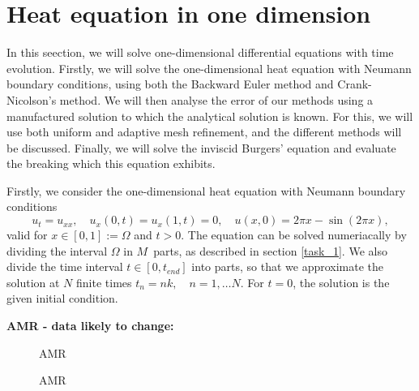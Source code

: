 \section{Heat equation in one dimension}
In this seection, we will solve one-dimensional differential equations with time evolution. 
Firstly, we will solve the one-dimensional heat equation with Neumann boundary conditions, using both the Backward Euler method and Crank-Nicolson's method.
We will then analyse the error of our methods using a manufactured solution to which the analytical solution is known.
For this, we will use both uniform and adaptive mesh refinement, and the different methods will be discussed.
Finally, we will solve the inviscid Burgers' equation and evaluate the breaking which this equation exhibits.

Firstly, we consider the one-dimensional heat equation with Neumann boundary conditions
\begin{equation*}
    u_t = u_{xx}, \quad u_x(0,t) = u_x(1,t) = 0, \quad u(x,0) = 2\pi x - \sin(2\pi x),
\end{equation*}
valid for $x \in [0,1] := \Omega$ and $t > 0$.
The equation can be solved numeriacally by dividing the interval $\Omega$ in $M$ parts, as described in section \ref{task_1}.
We also divide the time interval $t \in [0,t_{end}]$ into parts, so that we approximate the solution at $N$ finite times $t_n = nk, \quad n = 1, \ldots N$.
For $t = 0$, the solution is the given initial condition.


\begin{figure}[h]
    \centering
    
\end{figure}

\begin{figure}[h]
    \centering
    
\end{figure}

\begin{figure}[h]
    \centering
    
\end{figure}

\textbf{AMR - data likely to change:}

\begin{figure}[h]
    \centering
    
    \caption{AMR}
\end{figure}

\begin{figure}[h]
    \centering
    
    \caption{AMR}
\end{figure}
